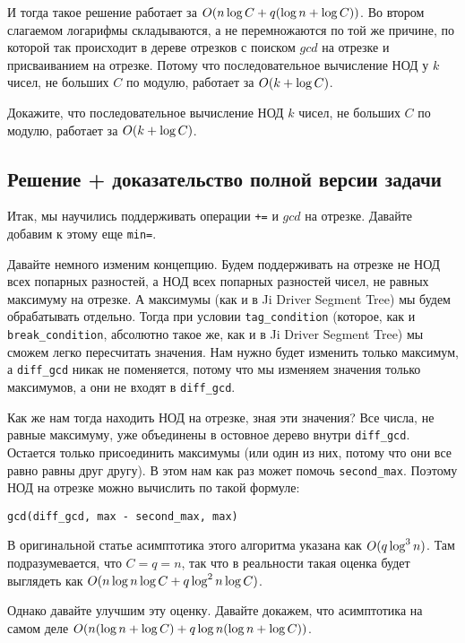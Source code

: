 И тогда такое решение работает за $O(n \log C + q (\log n +  \log C))$. Во втором слагаемом логарифмы складываются, а не перемножаются по той же причине, по которой так происходит в дереве отрезков с поиском $gcd$ на отрезке и присваиванием на отрезке. Потому что последовательное вычисление НОД у $k$ чисел, не больших $C$ по модулю, работает за $O(k + \log C)$.

\begin{exercise}
    Докажите, что последовательное вычисление НОД $k$ чисел, не больших $C$ по модулю, работает за $O(k + \log C)$.
\end{exercise}


\subsection{Решение + доказательство полной версии задачи}

Итак, мы научились поддерживать операции \verb^+=^ и $gcd$ на отрезке. Давайте добавим к этому еще \verb+min=+.

Давайте немного изменим концепцию. Будем поддерживать на отрезке не НОД всех попарных разностей, а НОД всех попарных разностей чисел, не равных максимуму на отрезке. А максимумы (как и в Ji Driver Segment Tree) мы будем обрабатывать отдельно. Тогда при условии \verb+tag_condition+ (которое, как и \verb+break_condition+, абсолютно такое же, как и в Ji Driver Segment Tree) мы сможем легко пересчитать значения. Нам нужно будет изменить только максимум, а \verb+diff_gcd+ никак не поменяется, потому что мы изменяем значения только максимумов, а они не входят в \verb+diff_gcd+.

Как же нам тогда находить НОД на отрезке, зная эти значения? Все числа, не равные максимуму, уже объединены в остовное дерево внутри \verb+diff_gcd+. Остается только присоединить максимумы (или один из них, потому что они все равно равны друг другу). В этом нам как раз может помочь \verb+second_max+. Поэтому НОД на отрезке можно вычислить по такой формуле:

\verb+gcd(diff_gcd, max - second_max, max)+


В оригинальной статье асимптотика этого алгоритма указана как $O(q \log^3 n)$. Там подразумевается, что $C = q = n$, так что в реальности такая оценка будет выглядеть как $O(n \log n \log C + q \log^2 n \log C)$.

Однако давайте улучшим эту оценку. Давайте докажем, что асимптотика на самом деле $O(n (\log n + \log C) + q \log n (\log n + \log C))$.


